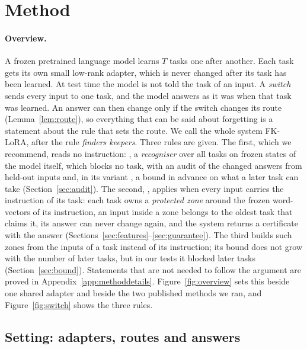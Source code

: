 \section{Method}
\label{sec:method}

\paragraph{Overview.} A frozen pretrained language model learns $T$ tasks one after another. Each
task gets its own small low-rank adapter, which is never changed after its task has been
learned. At test time the model is not told the task of an input. A \emph{switch} sends
every input to one task, and the model answers as it was when that task was
learned. An answer can then change only if the switch changes its route (Lemma~\ref{lem:route}),
so everything that can be said about forgetting is a statement about the rule that sets the route.
We call the whole system FK-LoRA, after the rule \emph{finders keepers}.
Three rules are given. The first, which we recommend, reads no instruction: \recog{}, a
\emph{recogniser} over all tasks on frozen states of the model itself, which blocks no task, with
an audit of the changed answers from held-out inputs and, in its variant \handicap{}, a bound in advance on what a later task
can take (Section~\ref{sec:audit}). The second, \cert{}, applies when every input carries the instruction of
its task: each task owns a \emph{protected zone} around the frozen word-vectors of its instruction,
an input inside a zone belongs to the oldest task that claims it, its answer can never change
again, and the system returns a certificate with the answer
(Sections~\ref{sec:features}--\ref{sec:guarantee}). The third builds such zones from the inputs of a
task instead of its instruction; its bound does not grow with the number of later tasks, but in our
tests it blocked later tasks (Section~\ref{sec:bound}). Statements that are not needed to follow the
argument are proved in Appendix~\ref{app:methoddetails}. Figure~\ref{fig:overview} sets this beside one shared adapter and beside the two published methods we ran, and Figure~\ref{fig:switch} shows the three rules.



\subsection{Setting: adapters, routes and answers}
\label{sec:setting}

